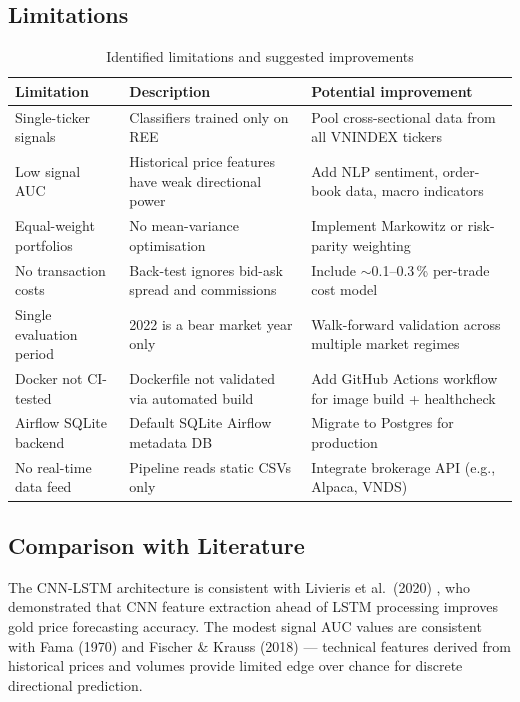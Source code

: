 \documentclass[12pt,a4paper]{article}
\begin{document}
\subsection{Limitations}

\begin{table}[H]
\centering
\caption{Identified limitations and suggested improvements}
\begin{tabularx}{\linewidth}{lXX}
\toprule
\textbf{Limitation} & \textbf{Description} & \textbf{Potential improvement} \\
\midrule
Single-ticker signals    & Classifiers trained only on REE & Pool cross-sectional data from all VNINDEX tickers \\
Low signal AUC           & Historical price features have weak directional power & Add NLP sentiment, order-book data, macro indicators \\
Equal-weight portfolios  & No mean-variance optimisation & Implement Markowitz or risk-parity weighting \\
No transaction costs     & Back-test ignores bid-ask spread and commissions & Include $\sim$0.1--0.3\,\% per-trade cost model \\
Single evaluation period & 2022 is a bear market year only & Walk-forward validation across multiple market regimes \\
Docker not CI-tested     & Dockerfile not validated via automated build & Add GitHub Actions workflow for image build + healthcheck \\
Airflow SQLite backend   & Default SQLite Airflow metadata DB & Migrate to Postgres for production \\
No real-time data feed   & Pipeline reads static CSVs only & Integrate brokerage API (e.g., Alpaca, VNDS) \\
\bottomrule
\end{tabularx}
\end{table}

\subsection{Comparison with Literature}

The CNN-LSTM architecture is consistent with Livieris et al.\ (2020)
\cite{livieris2020}, who demonstrated that CNN feature extraction ahead of LSTM
processing improves gold price forecasting accuracy. The modest signal AUC values
are consistent with Fama (1970) \cite{fama1970} and Fischer \& Krauss (2018)
\cite{fischer2018} --- technical features derived from historical prices and
volumes provide limited edge over chance for discrete directional prediction.
\end{document}

